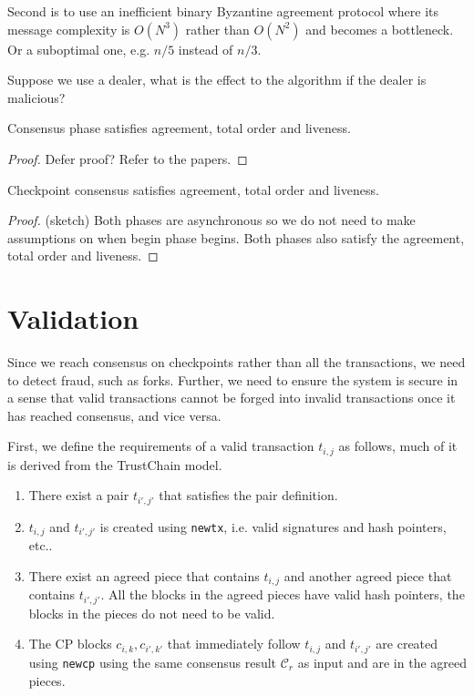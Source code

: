 Second is to use an inefficient binary Byzantine agreement protocol where its
message complexity is $O(N^3)$ rather than $O(N^2)$ and becomes a bottleneck. Or
a suboptimal one, e.g. $n/5$ instead of $n/3$.

Suppose we use a dealer, what is the effect to the algorithm if the dealer is
malicious?

\begin{lemma}
  Consensus phase satisfies agreement, total order and liveness.
\end{lemma}
\begin{proof}
  Defer proof? Refer to the papers.
\end{proof}

\begin{theorem}
  Checkpoint consensus satisfies agreement, total order and liveness.
\end{theorem}
\begin{proof}
  (sketch) Both phases are asynchronous so we do not need to make assumptions on
  when begin phase begins. Both phases also satisfy the agreement, total order
  and liveness.
\end{proof}

\section{Validation}\label{sec:validation}

Since we reach consensus on checkpoints rather than all the transactions, we
need to detect fraud, such as forks. Further, we need to ensure the system is
secure in a sense that valid transactions cannot be forged into invalid
transactions once it has reached consensus, and vice versa.

First, we define the requirements of a valid transaction $t_{i,j}$ as follows,
much of it is derived from the TrustChain model.

\begin{enumerate}
\item There exist a pair $t_{i', j'}$ that satisfies the pair definition.
\item $t_{i,j}$ and $t_{i', j'}$ is created using \texttt{newtx}, i.e. valid
  signatures and hash pointers, etc..
\item There exist an agreed piece that contains $t_{i, j}$ and another agreed
  piece that contains $t_{i', j'}$. All the blocks in the agreed pieces have
  valid hash pointers, the blocks in the pieces do not need to be valid.
\item The CP blocks $c_{i, k}, c_{i', k'}$ that immediately follow $t_{i, j}$
  and $t_{i', j'}$ are created using \texttt{newcp} using the same consensus
  result $\mathcal{C}_r$ as input and are in the agreed pieces.
\end{enumerate}

